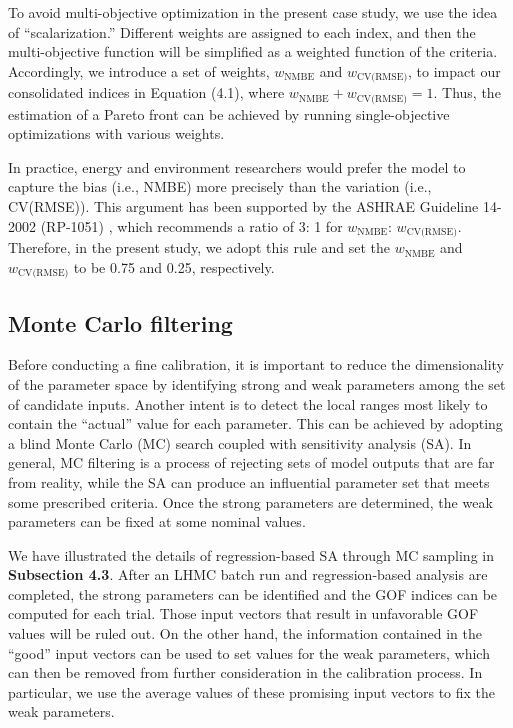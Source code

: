 To avoid multi-objective optimization in the present case study, we use the idea of ``scalarization.'' Different weights are assigned to each index, and then the multi-objective function will be simplified as a weighted function of the criteria. Accordingly, we introduce a set of weights, $w_{\textrm{NMBE}}$ and $w_{\textrm{CV(RMSE)}}$, to impact our consolidated indices in Equation (4.1), where $w_{\textrm{NMBE}} + w_{\textrm{CV(RMSE)}} = 1$. Thus, the estimation of a Pareto front can be achieved by running single-objective optimizations with various weights.

In practice, energy and environment researchers would prefer the model to capture the bias (i.e., NMBE) more precisely than the variation (i.e., CV(RMSE)). This argument has been supported by the ASHRAE Guideline 14-2002 (RP-1051) \cite{reddy2007calibrating,guideline2002guideline}, which recommends a ratio of 3: 1 for $w_{\textrm{NMBE}}$: $w_{\textrm{CV(RMSE)}}$. Therefore, in the present study, we adopt this rule and set the $w_{\textrm{NMBE}}$ and $w_{\textrm{CV(RMSE)}}$ to be 0.75 and 0.25, respectively.

\subsection{Monte Carlo filtering}

Before conducting a fine calibration, it is important to reduce the dimensionality of the parameter space by identifying strong and weak parameters among the set of candidate inputs. Another intent is to detect the local ranges most likely to contain the ``actual'' value for each parameter. This can be achieved by adopting a blind Monte Carlo (MC) search coupled with sensitivity analysis (SA). In general, MC filtering is a process of rejecting sets of model outputs that are far from reality, while the SA can produce an influential parameter set that meets some prescribed criteria. Once the strong parameters are determined, the weak parameters can be fixed at some nominal values.

We have illustrated the details of regression-based SA through MC sampling in \textbf{Subsection 4.3}. After an LHMC batch run and regression-based analysis are completed, the strong parameters can be identified and the GOF indices can be computed for each trial. Those input vectors that result in unfavorable GOF values will be ruled out. On the other hand, the information contained in the ``good'' input vectors can be used to set values for the weak parameters, which can then be removed from further consideration in the calibration process. In particular, we use the average values of these promising input vectors to fix the weak parameters.

